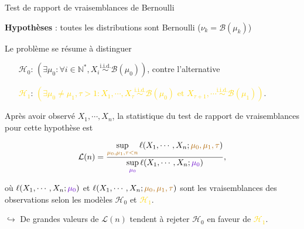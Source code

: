 \documentclass[11pt,french,ignorenonframetext,]{beamer}
\begin{document}
\begin{frame}{Test de rapport de vraisemblances de Bernoulli}

  \textbf{Hypothèses} : toutes les distributions sont Bernoulli ($\nu_k = \mathcal{B}(\mu_k)$)

  Le problème se résume à distinguer
  \begin{itemize}
    \item[\textcolor{deeppurple}{$\mathcal{H}_0$}:]
    \textcolor{deeppurple}{$(\exists \mu_0 : \forall i\in\mathbb{N}^*, X_i \overset{\text{i.i.d.}}{\sim} \mathcal{B}(\mu_0))$},
    contre l'alternative
    \item[\textcolor{gold}{$\mathcal{H}_1$}:]
    \textcolor{gold}{$(\exists \mu_0 \neq \mu_1, \tau > 1 : X_1, \cdots, X_\tau \overset{\text{i.i.d.}}{\sim} \mathcal{B}(\mu_0) \text{~et~} X_{\tau+1}, \cdots \overset{\text{i.i.d.}}{\sim} \mathcal{B}(\mu_1))$}.
  \end{itemize}

  \pause

  Après avoir observé $X_1,\cdots,X_n$, la statistique du \alert{test de rapport de vraisemblances} pour cette hypothèse est
  \begin{small}
    \[ \mathcal{L}(n) = \frac{\sup\limits_{\textcolor{gold}{\mu_0,\mu_1,\tau < n}}\ell(X_1,\cdots,X_n ; \textcolor{gold}{\mu_0,\mu_1,\tau})}{\sup\limits_{\textcolor{deeppurple}{\mu_0}}\ell(X_1,\cdots,X_n ;\textcolor{deeppurple}{\mu_0})},\]
  \end{small}

  où $\ell(X_1,\cdots,X_n ; \textcolor{deeppurple}{\mu_0})$ et $\ell(X_1,\cdots,X_n ; \textcolor{gold}{\mu_0,\mu_1,\tau})$ sont les vraisemblances des observations selon les modèles \textcolor{deeppurple}{$\mathcal{H}_0$} et \textcolor{gold}{$\mathcal{H}_1$}.

  \pause

  \alert{$\hookrightarrow$ De grandes valeurs de $\mathcal{L}(n)$ tendent à rejeter \textcolor{deeppurple}{$\mathcal{H}_0$} en faveur de \textcolor{gold}{$\mathcal{H}_1$}.}

\end{frame}
\end{document}
